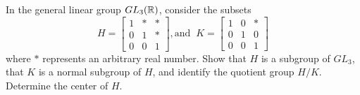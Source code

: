 \documentclass[10pt]{article}
\begin{document}
\begin{problem}
	In the general linear group \( GL_3(\mathbb R) \), consider the subsets
	\[
		H = \begin{bmatrix} 1 & * & * \\0 & 1 & * \\ 0 & 0 & 1  \end{bmatrix} , 
		\text{and } \ 
		K = \begin{bmatrix} 1 & 0 & * \\ 0 & 1 & 0\\ 0 & 0 & 1 \end{bmatrix} 
	\] 
	where \( * \) represents an arbitrary real number. Show that \( H \) is a 
	subgroup of \( GL_3 \), that \( K \) is a normal subgroup of \( H \), and 
	identify the quotient group \( H / K \). Determine the center of \( H \). 
\end{problem}
\end{document}
